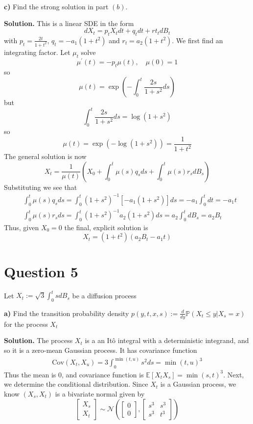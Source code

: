 \documentclass{article}
\begin{document}
\begin{tcolorbox}
[colframe=black,colback=gray!5,boxrule=0.5pt]
 \textbf{c)} Find the strong solution in part $(b)$.
\end{tcolorbox}
\textbf{Solution.} This is a linear SDE in the form 
$$dX_t = p_t X_t dt + q_tdt + rt_tdB_t$$
with $p_t = \frac{2t}{1+t^2}$, $q_t = -a_1(1+t^2)$ and $r_t = a_2(1+t^2)$. We first find an integrating factor. Let $\mu_t$ solve 
$$\mu^\prime(t) = -p_t \mu(t), \quad \mu(0)=1$$
so 
$$\mu(t) = \exp\left(-\int_0^t\frac{2s}{1+s^2}ds\right)$$
but
$$\int_0^t\frac{2s}{1+s^2}ds = \log(1+s^2)$$
so 
$$\mu(t) = \exp(-\log(1+s^2)) = \frac{1}{1+t^2}$$
The general solution is now
$$X_t = \frac{1}{\mu(t)}\left(X_0 + \int_0^t\mu(s)q_sds + \int_0^t\mu(s)r_sdB_s\right)$$
Substituting we see that 
\begin{align*}
    & \int_0^t \mu(s)q_sds = \int_0^t(1+s^2)^{-1}[-a_1(1+s^2)]ds = -a_1\int_0^tdt = -a_1t \\
    & \int_0^t\mu(s)r_sds = \int_0^t(1+s^2)^{-1}a_2(1+s^2)ds = a_2\int_0^tdB_s = a_2B_t
\end{align*}
Thus, given $X_0=0$ the final, explicit solution is 
$$X_t = (1+t^2)(a_2B_t - a_1t)$$

\newpage
\section{Question 5}
\begin{tcolorbox}
[colframe=black,colback=gray!5,boxrule=0.5pt]
 Let $X_t := \sqrt{3}\int_0^tsdB_s$ be a diffusion process
\end{tcolorbox}
\begin{tcolorbox}
[colframe=black,colback=gray!5,boxrule=0.5pt]
    \textbf{a)} Find the transition probability density $p(y,t,x,s):=\frac{d}{dy}\mathbb{P}(X_t\leq y | X_s=x)$ for the process $X_t$
\end{tcolorbox}
\textbf{Solution.}
The process $X_t$ is a an Itô integral with a deterministic integrand, and so it is a zero-mean Gaussian process. It has covariance function 
\begin{align*}
    \text{Cov}(X_t,X_u) = 3\int_0^{\min(t,u)}s^2ds = \min(t,u)^3
\end{align*}
Thus the mean is 0, and covariance function is $\mathbb{E}[X_tX_s] = \min(s,t)^3$. Next, we determine the conditional distribution. Since $X_t$ is a Gaussian process, we know $(X_s, X_t)$ is a bivariate normal given by 
\[
\begin{bmatrix}
X_s \\
X_t
\end{bmatrix}
\sim \mathcal{N}\left(
\begin{bmatrix}
0 \\
0
\end{bmatrix},
\begin{bmatrix}
s^3 & s^3 \\
s^3 & t^3
\end{bmatrix}
\right)
\]
\end{document}
